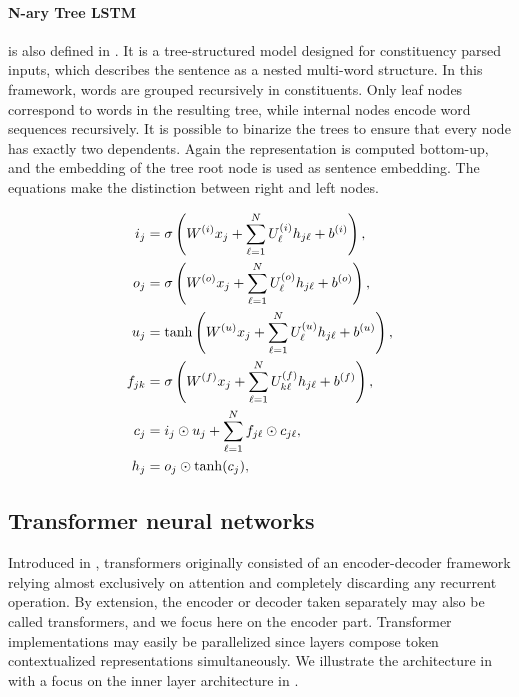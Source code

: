 \paragraph{N-ary Tree LSTM} is also defined in \textcite{tai_15}. It is a tree-structured model designed for constituency parsed inputs, which describes the sentence as a nested multi-word structure. In this framework, words are grouped recursively in constituents. Only leaf nodes correspond to words in the resulting tree, while internal nodes encode word sequences recursively. It is possible to binarize the trees to ensure that every node has exactly two dependents. Again the representation is computed bottom-up, and the embedding of the tree root node is used as sentence embedding. The equations make the distinction between right and left nodes.

\begin{align}
i_j &=\sigma \left( W^{(i)} x_j + \sum_{\ell=1}^N U^{(i)}_\ell h_{j\ell} + b^{(i)} \right), \labeq{nary-treelstm-def-first}\\
o_j &=\sigma \left( W^{(o)} x_j + \sum_{\ell=1}^N U^{(o)}_\ell h_{j\ell} + b^{(o)} \right), \\
u_j &= \tanh\left( W^{(u)} x_j + \sum_{\ell=1}^N U^{(u)}_\ell h_{j\ell}  + b^{(u)} \right), \\
f_{jk} &= \sigma\left( W^{(f)} x_j + \sum_{\ell=1}^N U^{(f)}_{k\ell} h_{j\ell} + b^{(f)} \right), \labeq{nary-treelstm-def-f}\\
c_j &= i_j \odot u_j + \sum_{\ell=1}^N f_{j\ell} \odot c_{j\ell}, \\
h_j &= o_j \odot \tanh(c_j), \labeq{nary-treelstm-def-last}
\end{align}

\subsection{Transformer neural networks}

Introduced in \textcite{vaswani_17}, transformers originally consisted of an encoder-decoder framework relying almost exclusively on attention and completely discarding any recurrent operation. By extension, the encoder or decoder taken separately may also be called transformers, and we focus here on the encoder part. Transformer implementations may easily be parallelized since layers compose token contextualized representations simultaneously. We illustrate the architecture in  with a focus on the inner layer architecture in .


